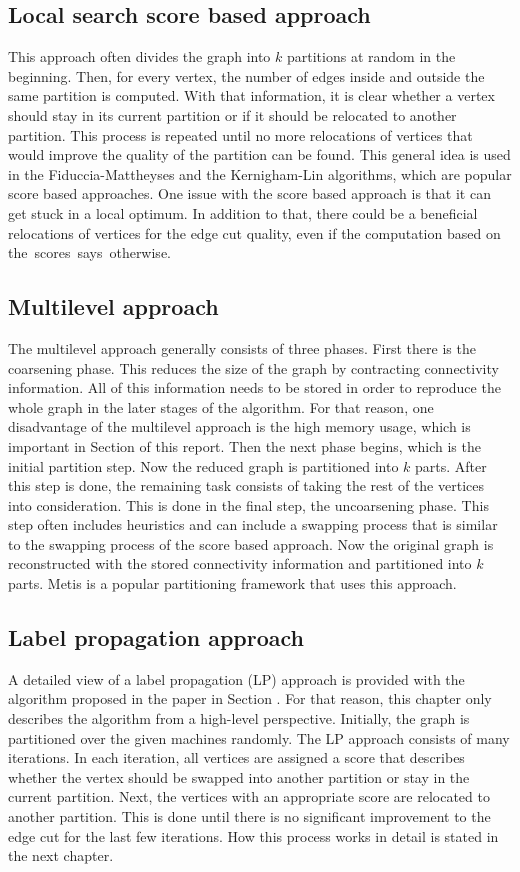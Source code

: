 \documentclass[acmsmall,nonacm,screen,review]{acmart}
\begin{document}
\subsection{Local search score based approach}
This approach often divides the graph into $k$ partitions at random in the beginning. Then, for every vertex, the number of edges inside and outside the same partition is computed. With that information, it is clear whether a vertex should stay in its current partition or if it should be relocated to another partition. This process is repeated until no more relocations of vertices that would improve the quality of the partition can be found. This general idea is used in the Fiduccia-Mattheyses \cite{FM} and the Kernigham-Lin \cite{KL} algorithms, which are popular score based approaches. One issue with the score based approach is that it can get stuck in a local optimum. In addition to that, there could be a beneficial relocations of vertices for the edge cut quality, even if the computation based on \hbox{the scores says otherwise.}
\subsection{Multilevel approach}
The multilevel approach generally consists of three phases. First there is the coarsening phase. This reduces the size of the graph by contracting connectivity information. All of this information needs to be stored in order to reproduce the whole graph in the later stages of the algorithm. For that reason, one disadvantage of the multilevel approach is the high memory usage, which is important in Section  of this report. Then the next phase begins, which is the initial partition step. Now the reduced graph is partitioned into $k$ parts. After this step is done, the remaining task consists of taking the rest of the vertices into consideration. This is done in the final step, the uncoarsening phase. This step often includes heuristics and can include a swapping process that is similar to the swapping process of the score based approach. Now the original graph is reconstructed with the stored connectivity information and partitioned into $k$ parts. Metis \cite{Metis} is a popular partitioning framework that uses this approach.
\subsection{Label propagation approach}
A detailed view of a label propagation (LP) approach is provided with the algorithm proposed in the paper \cite{Main} in Section . For that reason, this chapter only describes the algorithm from a high-level perspective. Initially, the graph is partitioned over the given machines randomly. The LP approach consists of many iterations. In each iteration, all vertices are assigned a score that describes whether the vertex should be swapped into another partition or stay in the current partition. Next, the vertices with an appropriate score are relocated to another partition. This is done until there is no significant improvement to the edge cut for the last few iterations. How this process works in detail is stated in the next chapter.
\end{document}
